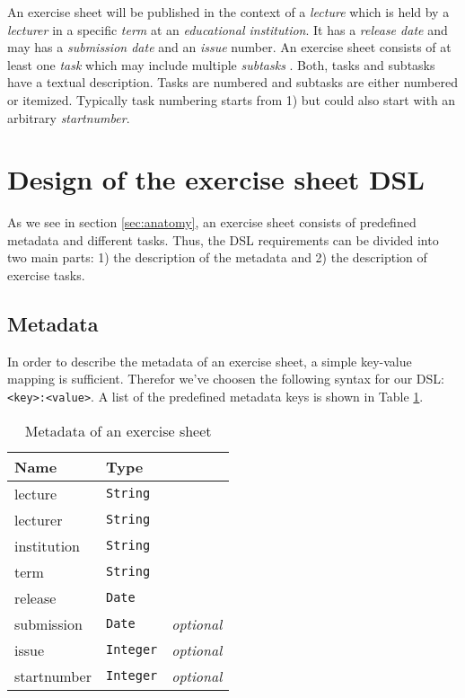 \documentclass[12pt,letterpaper, onecolumn]{article}
\begin{document}
An exercise sheet will be published in the context of a \emph{lecture} which is held by a \emph{lecturer} in a specific \emph{term} at an \emph{educational institution}. It has a \emph{release date} and may has a \emph{submission date} and an \emph{issue} number. An exercise sheet consists of at least one \emph{task} which may include multiple \emph{subtasks }. Both, tasks and subtasks have a textual description. Tasks are numbered and subtasks are either numbered or itemized. Typically task numbering starts from 1) but could also start with an arbitrary \emph{startnumber}.

\section{Design of the exercise sheet DSL}\label{sec:dsl}

As we see in section \ref{sec:anatomy}, an exercise sheet consists of predefined metadata and different tasks. Thus, the DSL requirements can be divided into two main parts: 1) the description of the metadata and 2) the description of exercise tasks.\\

\subsection{Metadata}

In order to describe the metadata of an exercise sheet, a simple key-value mapping is sufficient. Therefor we've choosen the following syntax for our DSL: \texttt{\textless key\textgreater:\textless value\textgreater}. A list of the predefined metadata keys is shown in Table \ref{tab:metadata}.

\begin{table}[!h]
	\centering
	\begin{tabular}{ | p{2cm} | p{2cm} | c | }
		\hline
		Name & Type & \\ \hline
		\hline
		lecture & \texttt{String} & \\
		lecturer & \texttt{String} & \\
		institution & \texttt{String} & \\
		term & \texttt{String} & \\
		release & \texttt{Date} & \\
		submission & \texttt{Date} & \emph{optional} \\
		issue & \texttt{Integer} & \emph{optional} \\
		startnumber & \texttt{Integer} & \emph{optional} \\
		\hline
	\end{tabular}
	\caption{Metadata of an exercise sheet}
	\label{tab:metadata}
\end{table}
\end{document}
